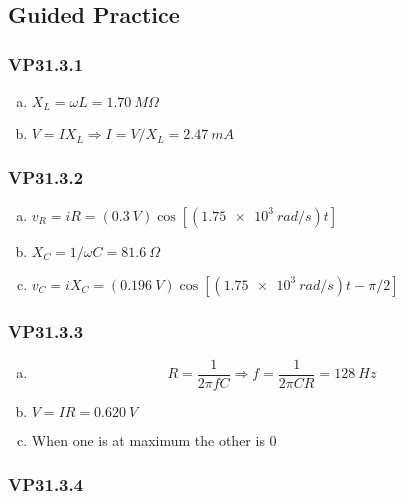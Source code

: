 \documentclass{article}
\begin{document}
\subsection{Guided Practice}

\subsubsection{VP31.3.1}

\begin{enumerate}[(a)]
  \item $X_L = \omega L = \qty{1.70}{M \Omega}$

  \item $V = I X_L \Rightarrow I = V / X_L = \qty{2.47}{mA}$
\end{enumerate}

\subsubsection{VP31.3.2}

\begin{enumerate}[(a)]
  \item $v_R = i R = (\qty{0.3}{V}) \cos [(\qty{1.75e3}{rad/s}) t]$

  \item $X_C = 1 / \omega C = \qty{81.6}{\Omega}$

  \item $v_C = i X_C = (\qty{0.196}{V}) \cos [(\qty{1.75e3}{rad/s}) t - \pi / 2]$
\end{enumerate}

\subsubsection{VP31.3.3}

\begin{enumerate}[(a)]
  \item \[R = \frac{1}{2 \pi f C} \Rightarrow f = \frac{1}{2 \pi C R} = \qty{128}{Hz}\]

  \item $V = I R = \qty{0.620}{V}$

  \item When one is at maximum the other is 0
\end{enumerate}

\subsubsection{VP31.3.4}
\end{document}
